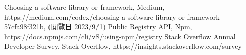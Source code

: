 \documentclass[main]{subfiles}
\begin{document}
\begin{thebibliography}{9}\setlength{\itemsep}{-2pt}
 Choosing a software library or framework, Medium, https://medium.com/codex/choosing-a-software-library-or-framework-57cfa98f321b, (閲覧日 2023/9/1) 
 Public Registry API, Npm, https://docs.npmjs.com/cli/v8/using-npm/registry
 Stack Overflow Annual Developer Survey, Stack Overflow, https://insights.stackoverflow.com/survey
\end{thebibliography}
\end{document}
